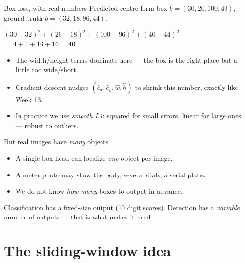 \documentclass[10pt,aspectratio=169]{beamer}
\begin{document}
\begin{frame}{Box loss, with real numbers}
  Predicted centre-form box $\hat{b}=(30,20,100,40)$, ground truth $b=(32,18,96,44)$.
  \begin{mathbox}
    $(30{-}32)^2+(20{-}18)^2+(100{-}96)^2+(40{-}44)^2$\\
    $=4+4+16+16=\mathbf{40}$
  \end{mathbox}
  \begin{itemize}
    \item The width/height terms dominate here --- the box is the right place but a little too wide/short.
    \item Gradient descent nudges $(\hat{c}_x,\hat{c}_y,\hat{w},\hat{h})$ to shrink this number, exactly like Week 13.
    \item In practice we use \emph{smooth L1}: squared for small errors, linear for large ones --- robust to outliers.
  \end{itemize}
\end{frame}

\begin{frame}{But real images have \emph{many} objects}
  \begin{itemize}
    \item A single box head can localize \emph{one} object per image.
    \item A meter photo may show the body, several dials, a serial plate\ldots
    \item We do not know \emph{how many} boxes to output in advance.
  \end{itemize}
  \begin{badbox}
    Classification has a fixed-size output (10 digit scores). Detection has a \emph{variable} number of outputs --- that is what makes it hard.
  \end{badbox}
\end{frame}

\section{The sliding-window idea}
\end{document}
